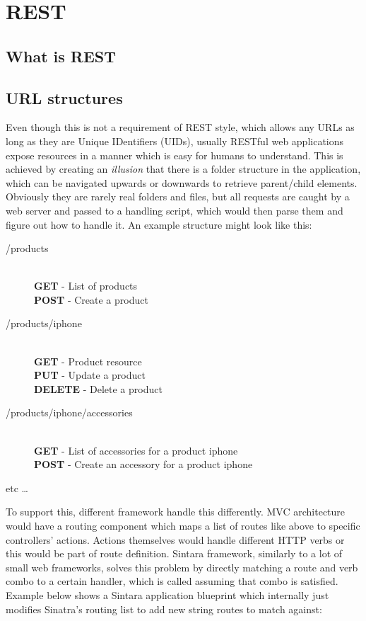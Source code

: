 \chapter{REST}

\section{What is REST}

\section{URL structures}

Even though this is not a requirement of REST style, which allows any URLs as long as they are Unique IDentifiers (UIDs), usually RESTful web applications expose resources in a manner which is easy for humans to understand. This is achieved by creating an \textit{illusion} that there is a folder structure in the application, which can be navigated upwards or downwards to retrieve parent/child elements. Obviously they are rarely real folders and files, but all requests are caught by a web server and passed to a handling script, which would then parse them and figure out how to handle it. An example structure might look like this:

\begin{description}
  \item[/products] \hfill \\
  \textbf{GET}     - List of products \\
  \textbf{POST}    - Create a product
  \item[/products/iphone] \hfill \\
  \textbf{GET}     - Product resource \\
  \textbf{PUT}     - Update a product \\
  \textbf{DELETE}  - Delete a product
  \item[/products/iphone/accessories] \hfill \\
  \textbf{GET}     - List of accessories for a product iphone \\
  \textbf{POST}    - Create an accessory for a product iphone
  \item[etc \ldots]
\end{description}

To support this, different framework handle this differently. MVC architecture would have a routing component which maps a list of routes like above to specific controllers' actions. Actions themselves would handle different HTTP verbs or this would be part of route definition. Sintara framework, similarly to a lot of small web frameworks, solves this problem by directly matching a route and verb combo to a certain handler, which is called assuming that combo is satisfied. Example below shows a Sintara application blueprint which internally just modifies Sinatra's routing list to add new string routes to match against:

